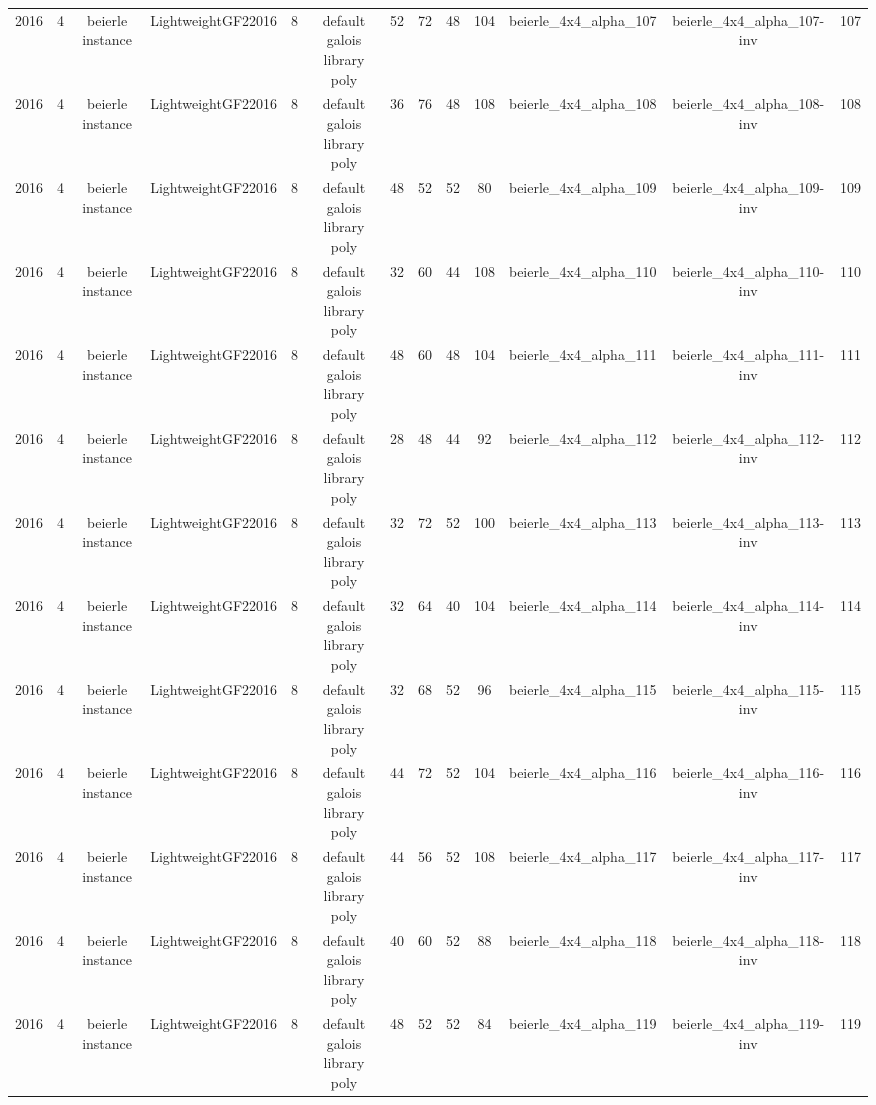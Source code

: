 \begin{tabular}{c c c c c c c c c c c c c}
2016 & 4 & beierle instance & LightweightGF22016 & 8 & default galois library poly & 52 & 72 & 48 & 104 & beierle_4x4_alpha_107 & beierle_4x4_alpha_107-inv & 107 \\
2016 & 4 & beierle instance & LightweightGF22016 & 8 & default galois library poly & 36 & 76 & 48 & 108 & beierle_4x4_alpha_108 & beierle_4x4_alpha_108-inv & 108 \\
2016 & 4 & beierle instance & LightweightGF22016 & 8 & default galois library poly & 48 & 52 & 52 & 80 & beierle_4x4_alpha_109 & beierle_4x4_alpha_109-inv & 109 \\
2016 & 4 & beierle instance & LightweightGF22016 & 8 & default galois library poly & 32 & 60 & 44 & 108 & beierle_4x4_alpha_110 & beierle_4x4_alpha_110-inv & 110 \\
2016 & 4 & beierle instance & LightweightGF22016 & 8 & default galois library poly & 48 & 60 & 48 & 104 & beierle_4x4_alpha_111 & beierle_4x4_alpha_111-inv & 111 \\
2016 & 4 & beierle instance & LightweightGF22016 & 8 & default galois library poly & 28 & 48 & 44 & 92 & beierle_4x4_alpha_112 & beierle_4x4_alpha_112-inv & 112 \\
2016 & 4 & beierle instance & LightweightGF22016 & 8 & default galois library poly & 32 & 72 & 52 & 100 & beierle_4x4_alpha_113 & beierle_4x4_alpha_113-inv & 113 \\
2016 & 4 & beierle instance & LightweightGF22016 & 8 & default galois library poly & 32 & 64 & 40 & 104 & beierle_4x4_alpha_114 & beierle_4x4_alpha_114-inv & 114 \\
2016 & 4 & beierle instance & LightweightGF22016 & 8 & default galois library poly & 32 & 68 & 52 & 96 & beierle_4x4_alpha_115 & beierle_4x4_alpha_115-inv & 115 \\
2016 & 4 & beierle instance & LightweightGF22016 & 8 & default galois library poly & 44 & 72 & 52 & 104 & beierle_4x4_alpha_116 & beierle_4x4_alpha_116-inv & 116 \\
2016 & 4 & beierle instance & LightweightGF22016 & 8 & default galois library poly & 44 & 56 & 52 & 108 & beierle_4x4_alpha_117 & beierle_4x4_alpha_117-inv & 117 \\
2016 & 4 & beierle instance & LightweightGF22016 & 8 & default galois library poly & 40 & 60 & 52 & 88 & beierle_4x4_alpha_118 & beierle_4x4_alpha_118-inv & 118 \\
2016 & 4 & beierle instance & LightweightGF22016 & 8 & default galois library poly & 48 & 52 & 52 & 84 & beierle_4x4_alpha_119 & beierle_4x4_alpha_119-inv & 119 \\

\end{tabular}
